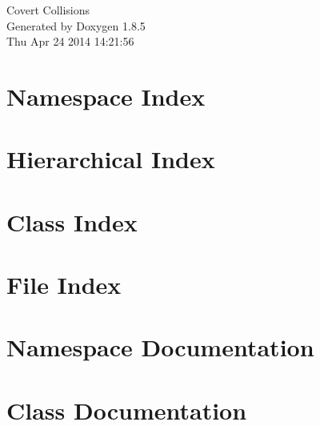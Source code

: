 \documentclass[twoside]{book}
\newcommand{\clearemptydoublepage}{%
  \newpage{\pagestyle{empty}\cleardoublepage}%
}
\begin{document}
\hypersetup{pageanchor=false}
\begin{titlepage}
\vspace*{7cm}
\begin{center}%
{\Large Covert Collisions }\\
\vspace*{1cm}
{\large Generated by Doxygen 1.8.5}\\
\vspace*{0.5cm}
{\small Thu Apr 24 2014 14:21:56}\\
\end{center}
\end{titlepage}
\clearemptydoublepage
\tableofcontents
\clearemptydoublepage
{}
\hypersetup{pageanchor=true}

\chapter{Namespace Index}

\chapter{Hierarchical Index}

\chapter{Class Index}

\chapter{File Index}

\chapter{Namespace Documentation}

\chapter{Class Documentation}














\end{document}
